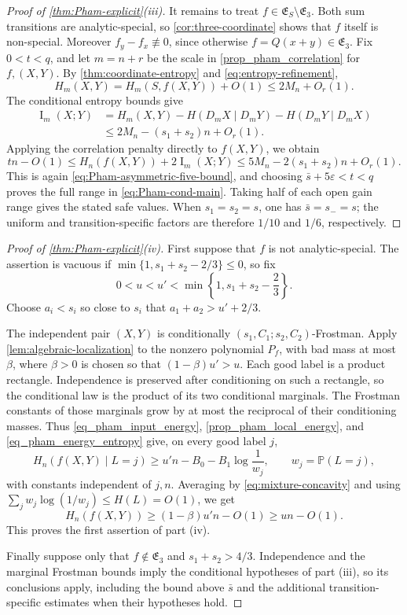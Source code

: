 \documentclass[11pt]{article}
\begin{document}
\begin{proof}[Proof of \cref{thm:Pham-explicit}\textup{(iii)}]
It remains to treat \(f\in\mathfrak E_S\setminus\mathfrak E_3\).
Both sum transitions are analytic-special, so
\cref{cor:three-coordinate} shows that \(f\) itself is non-special.
Moreover \(f_y-f_x\not\equiv0\), since otherwise
\(f=Q(x+y)\in\mathfrak E_3\).  Fix \(0<t<q\), and let
\(m=n+r\) be the scale in \cref{prop_pham_correlation} for
\(f,(X,Y)\).  By \cref{thm:coordinate-entropy} and
\eqref{eq:entropy-refinement},
\[
 H_m(X,Y)=H_m(S,f(X,Y))+O(1)\le2M_n+O_r(1).
\]
The conditional entropy bounds give
\begin{align*}
 \operatorname{I}_m(X;Y)
 &=H_m(X,Y)-H(D_mX\mid D_mY)-H(D_mY\mid D_mX)\\
 &\le2M_n-(s_1+s_2)n+O_r(1).
\end{align*}
Applying the correlation penalty directly to \(f(X,Y)\), we obtain
\[
 tn-O(1)\le H_n(f(X,Y))+2\operatorname{I}_m(X;Y)
 \le5M_n-2(s_1+s_2)n+O_r(1).
\]
This is again \eqref{eq:Pham-asymmetric-five-bound}, and choosing
\(\bar s+5\varepsilon<t<q\) proves the full range in
\eqref{eq:Pham-cond-main}.  Taking half of each open gain range
gives the stated safe values.  When \(s_1=s_2=s\), one has
\(\bar s=s_-=s\); the uniform and transition-specific factors are
therefore \(1/10\) and \(1/6\), respectively.
\end{proof}

\begin{proof}[Proof of \cref{thm:Pham-explicit}\textup{(iv)}]
First suppose that \(f\) is not analytic-special.  The assertion is
vacuous if
\(\min\{1,s_1+s_2-2/3\}\le0\), so fix
\[
 0<u<u'<\min\left\{1,s_1+s_2-\frac{2}{3}\right\}.
\]
Choose \(a_i<s_i\) so close to \(s_i\) that
\(a_1+a_2>u'+2/3\).

The independent pair \((X,Y)\) is conditionally
\((s_1,C_1;s_2,C_2)\)-Frostman.  Apply
\cref{lem:algebraic-localization} to the nonzero polynomial \(P_f\),
with bad mass at most \(\beta\), where \(\beta>0\) is chosen so that
\((1-\beta)u'>u\).  Each good label is a product rectangle.
Independence is preserved after conditioning on such a rectangle,
so the conditional law is the product of its two conditional
marginals.  The Frostman constants of those marginals grow by at
most the reciprocal of their conditioning masses.  Thus
\eqref{eq_pham_input_energy},
\cref{prop_pham_local_energy}, and
\eqref{eq_pham_energy_entropy} give, on every good label \(j\),
\[
 H_n(f(X,Y)\mid L=j)
 \ge u'n-B_0-B_1\log\frac{1}{w_j},
 \qquad w_j=\mathbb P(L=j),
\]
with constants independent of \(j,n\).  Averaging by
\eqref{eq:mixture-concavity} and using
\(\sum_jw_j\log(1/w_j)\le H(L)=O(1)\), we get
\[
 H_n(f(X,Y))\ge(1-\beta)u'n-O(1)\ge u n-O(1).
\]
This proves the first assertion of part \textup{(iv)}.

Finally suppose only that \(f\notin\mathfrak E_3\) and
\(s_1+s_2>4/3\).  Independence and the marginal Frostman bounds
imply the conditional hypotheses of part \textup{(iii)}, so its
conclusions apply, including the bound above \(\bar s\) and the
additional transition-specific estimates when their hypotheses hold.
\end{proof}
\end{document}
